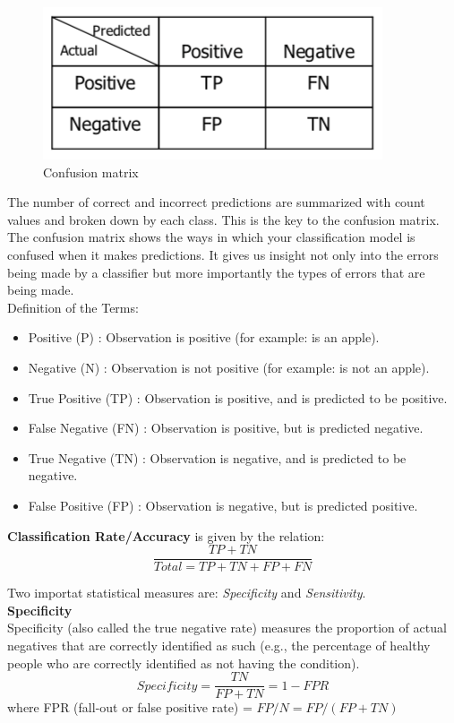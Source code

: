 \documentclass[../main.tex]{subfiles}
\begin{document}
\begin{figure}[H]
    \centering
    \includegraphics[scale = 0.4]{lectures/1_Introduction/intro_classification_accuracy.png}
    \caption{Confusion matrix}
    \label{fig:Confusion matrix}
\end{figure}
The number of correct and incorrect predictions are summarized with count values and broken down by each class. This is the key to the confusion matrix.
The confusion matrix shows the ways in which your classification model is confused when it makes predictions.
It gives us insight not only into the errors being made by a classifier but more importantly the types of errors that are being made.\\

Definition of the Terms:
\begin{itemize}
    \item Positive (P) : Observation is positive (for example: is an apple).
    \item Negative (N) : Observation is not positive (for example: is not an apple).
    \item True Positive (TP) : Observation is positive, and is predicted to be positive.
    \item False Negative (FN) : Observation is positive, but is predicted negative.
    \item True Negative (TN) : Observation is negative, and is predicted to be negative.
    \item False Positive (FP) : Observation is negative, but is predicted positive.
\end{itemize}

\noindent\textbf{Classification Rate/Accuracy} is given by the relation:
$$ \frac{TP + TN}{Total = TP + TN + FP + FN}$$ 

Two importat statistical measures are: \textit{Specificity} and \textit{Sensitivity}.\\

\noindent\textbf{Specificity}\\
Specificity (also called the true negative rate) measures the proportion of actual negatives that are correctly identified as such (e.g., the percentage of healthy people who are correctly identified as not having the condition).
$$ Specificity = \frac{TN}{FP + TN} = 1 - FPR $$
where FPR (fall-out or false positive rate) = $FP/N = FP/(FP + TN)$\\
\end{document}

